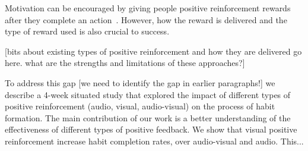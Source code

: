 \documentclass{scaffold/sigchi}
\begin{document}

Motivation can be encouraged by giving people positive reinforcement rewards after they complete an action~\cite{positive_reinforcement_pro}. However, how the reward is delivered and the type of reward used is also crucial to success.

[bits about existing types of positive reinforcement and how they are delivered go here. what are the strengths and limitations of these approaches?]


To address this gap [we need to identify the gap in earlier paragraphs!] we describe a 4-week situated study that explored the impact of different types of positive reinforcement (audio, visual, audio-visual) on the process of habit formation. The main contribution of our work is a better understanding of the effectiveness of different types of positive feedback. We show that visual positive reinforcement increase habit completion rates, over audio-visual and audio. This...
\end{document}
